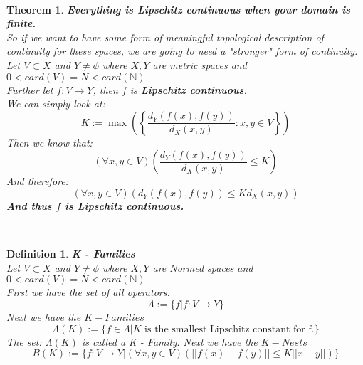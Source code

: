 \documentclass[12pt]{extarticle}
\theoremstyle{plain}
\newtheorem{thm}{Theorem}[section]
\theoremstyle{plain}
\theoremstyle{plain}
\theoremstyle{Definition}
\newtheorem{def.}{Definition}[section]
\theoremstyle{Definition}
\theoremstyle{plain}
\newcommand{\cut}[0]{\noindent\framebox[\linewidth]{\rule{\linewidth}{2pt}}\\}
\begin{document}
	\cut
	\begin{thm} \textbf{Everything is Lipschitz continuous when your domain is finite.} \\
		So if we want to have some form of meaningful topological description of continuity for these spaces, we are going to need a "stronger" form of continuity. \\
		Let $V \subset X$ and $Y \not = \phi$ where $X,Y$ are metric spaces and $0 < card(V) = N < card(\mathbb{N})$ \\
		Further let $f : V \to Y$, then $f$ is \textbf{Lipschitz continuous}. \\
		We can simply look at: \\
		$$K := \max\left( \left\{\frac{d_Y(f(x),f(y))}{d_X(x,y)} : x,y \in V \right\} \right)$$
		Then we know that: 
		$$(\forall x,y \in V)\left( \frac{d_Y(f(x),f(y))}{d_X(x,y)} \leq K\right)$$
		And therefore: \\ 
		$$(\forall x,y \in V)\left( d_Y(f(x),f(y)) \leq Kd_X(x,y)\right)$$
		\textbf{And thus $f$ is Lipschitz continuous.} \\ 
	\end{thm}
	\cut
	\begin{def.} \textbf{K - Families} \\ 
		Let $V \subset X$ and $Y \not = \phi$ where $X,Y$ are Normed spaces and $0 < card(V) = N < card(\mathbb{N})$ \\
		First we have the set of all operators.  
		$$\Lambda := \{f | f : V \to Y\}$$
		Next we have the $K - Families$ 
		$$\Lambda(K) := \{f \in \Lambda | K \text{ is the smallest Lipschitz constant for f.}\}$$
		The set: $\Lambda(K)$ is called a K - Family. 
		Next we have the $K - Nests$ 
		$$B(K) := \{f : V \to Y | (\forall x,y \in V) (||f(x) - f(y)|| \leq K ||x - y||)\}$$
	\end{def.}
	\cut
\end{document}
